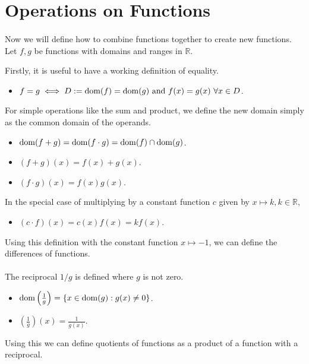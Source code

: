 \documentclass[../real_analysis.tex]{subfiles}
\begin{document}
    \section{Operations on Functions}
        \paragraph{}
        Now we will define how to combine functions together to create new functions. Let $f, g$ be functions with domains and ranges in $\mathbb{R}$.
        \begin{definition}
            Firstly, it is useful to have a working definition of equality.
            \begin{itemize}
                \item $f = g \iff D:= \dom(f) = \dom(g)\ \text{and}\ f(x) = g(x)\ \forall x \in D$.
            \end{itemize}
            For simple operations like the sum and product, we define the new domain simply as the common domain of the operands.
            \begin{itemize}
                \item $\operatorname{dom}(f+g) = \operatorname{dom}(f \cdot g) = \operatorname{dom}(f) \cap \operatorname{dom}(g)$.
                \item $(f+g)(x) = f(x) + g(x)$.
                \item $(f \cdot g)(x) = f(x)g(x)$.
            \end{itemize}
            In the special case of multiplying by a constant function $c$ given by $x \mapsto k, k \in \mathbb{R}$,
            \begin{itemize}
                \item $(c \cdot f)(x) = c(x)f(x) = kf(x)$.
            \end{itemize}
            Using this definition with the constant function $x \mapsto -1$, we can define the differences of functions.

            \paragraph{}
            The reciprocal $1 / g$ is defined where $g$ is not zero.
            \begin{itemize}
                \item $\operatorname{dom}\left(\frac{1}{g}\right) = \{x \in \operatorname{dom}(g) : g(x) \ne 0\}$.
                \item $\left(\frac{1}{g}\right)(x) = \frac{1}{g(x)}$.
            \end{itemize}
            Using this we can define quotients of functions as a product of a function with a reciprocal.
        \end{definition}
\end{document}
